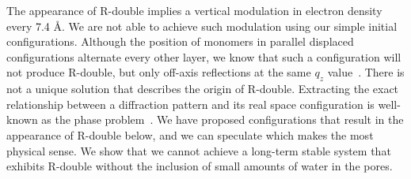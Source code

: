 \documentclass[journal=jpcbfk,manuscript=article]{achemso}
\begin{document}
  
  The appearance of R-double implies a vertical modulation in electron density every 7.4 \AA.
  We are not able to achieve such modulation using our simple initial configurations. Although
  the position of monomers in parallel displaced configurations alternate every other layer, 
  we know that such a configuration will not produce R-double, but only off-axis 
  reflections at the same $q_z$ value~\cite{harburn_atlas_1975}. There is not a unique solution
  that describes the origin of R-double. Extracting the exact relationship between a diffraction
  pattern and its real space configuration is well-known as the phase problem~\cite{taylor_phase_2003}.    
  We have proposed configurations that result in the appearance of R-double below, and we can 
  speculate which makes the most physical sense. We show that we cannot achieve a long-term
  stable system that exhibits R-double without the inclusion of small amounts of water in the pores.
  
 
\end{document}
